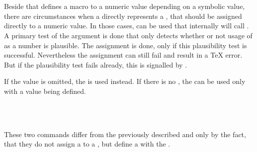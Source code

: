 \begin{Declaration}
  \\
  \\
\end{Declaration}
%
%
Beside  that
defines a macro to a numeric value depending on a symbolic value, there are
circumstances when a  directly represents a , that should be assigned directly to a numeric value. In those
cases,  can be used that internally will call
. A primary test of the  argument is done
that only detects whether or not usage of  as a number is
plausible. The assignment is done, only if this plausibility test is
successful. Nevertheless the assignment can still fail and result in a \TeX{}
error. But if the plausibility test fails already, this is signalled by
.

If the value is omitted, the
 is used instead. If there is no , the
 can be used only with a value being defined.%
%
%

\begin{Declaration}
  \\
  \\
\end{Declaration}
%
%
These two commands differ from the
previously described  and 
only by the fact, that they do not assign a  to a , but define a  with the
.%
%
%


